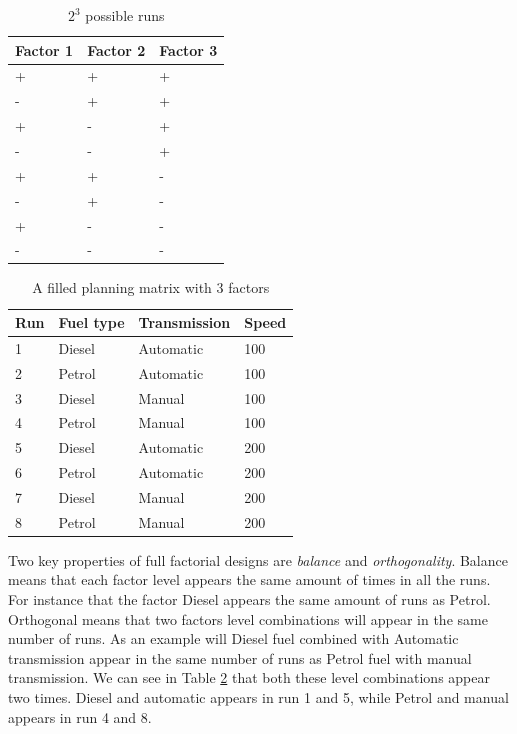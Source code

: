 \documentclass{llncs}
\begin{document}
\begin{table}
\begin{center}
    \begin{tabular}{ | l  l  l |}
    \hline
    {\bf Factor 1} & {\bf Factor 2} & {\bf Factor 3} \\ \hline
	 + & + & + \\ \hline
	  - & + & + \\ \hline
	 + & - & + \\ \hline
	  - & - & + \\ \hline
	 + & + & - \\ \hline
	  - & + & - \\ \hline
	 + & - & - \\ \hline
	  - & - &  - \\ \hline
    \end{tabular}
\end{center}
\caption{$2^3$ possible runs}\label{designs}
\end{table}

\begin{table}
\begin{center}
    \begin{tabular}{ | l | l  l  l |}
    \hline
    {\bf Run} &  {\bf Fuel type} & {\bf Transmission} & {\bf Speed} \\ \hline
	 1 & Diesel & Automatic & 100 \\ \hline
	 2 & Petrol & Automatic & 100 \\ \hline
	 3 & Diesel & Manual & 100 \\ \hline
	 4 & Petrol & Manual & 100 \\ \hline
	 5 & Diesel & Automatic & 200 \\ \hline
	 6 & Petrol & Automatic & 200 \\ \hline
	 7 & Diesel & Manual & 200 \\ \hline
	 8 & Petrol & Manual &  200 \\ \hline
    \end{tabular}
\end{center}
\caption{A filled planning matrix with 3 factors}\label{designsspec}
\end{table}

Two key properties of full factorial designs are \textit{balance} and
\textit{orthogonality}.  Balance means that each factor level appears
the same amount of times in all the runs. For instance that the factor
Diesel appears the same amount of runs as Petrol. Orthogonal means
that two factors level combinations will appear in the same number of
runs. As an example will Diesel fuel combined with Automatic
transmission appear in the same number of runs as Petrol fuel with
manual transmission. We can see in Table \ref{designsspec} that both
these level combinations appear two times. Diesel and automatic
appears in run 1 and 5, while Petrol and manual appears in run 4 and
8.
\end{document}
